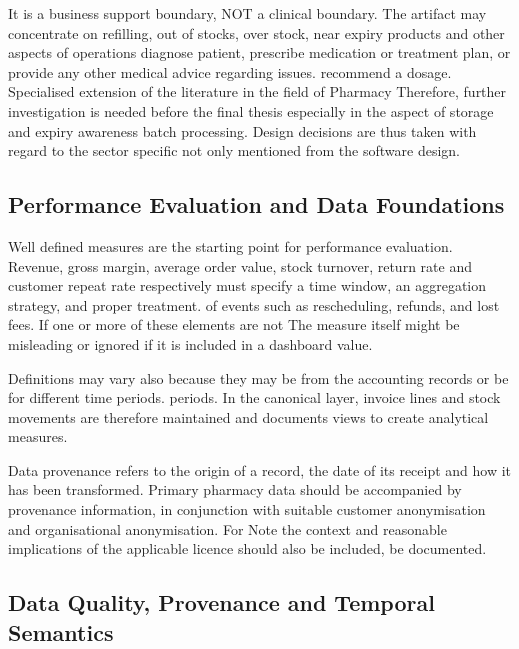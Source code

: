 \documentclass[a4paper,11pt,oneside]{book}
\theoremstyle{plain}
\theoremstyle{definition}
\theoremstyle{remark}
\begin{document}
It is a business support boundary, NOT a clinical boundary. The artifact may concentrate on refilling, out of stocks, over stock, near expiry products and other aspects of operations diagnose patient, prescribe medication or treatment plan, or provide any other medical advice regarding issues. recommend a dosage. Specialised extension of the literature in the field of Pharmacy Therefore, further investigation is needed before the final thesis especially in the aspect of storage and expiry awareness batch processing. Design decisions are thus taken with regard to the sector specific not only mentioned from the software design.

\subsection{Performance Evaluation and Data Foundations}

Well defined measures are the starting point for performance evaluation. Revenue, gross margin, average order value, stock turnover, return rate and customer repeat rate respectively must specify a time window, an aggregation strategy, and proper treatment. of events such as rescheduling, refunds, and lost fees. If one or more of these elements are not The measure itself might be misleading or ignored if it is included in a dashboard value.

Definitions may vary also because they may be from the accounting records or be for different time periods. periods. In the canonical layer, invoice lines and stock movements are therefore maintained and documents views to create analytical measures.

Data provenance refers to the origin of a record, the date of its receipt and how it has been transformed. Primary pharmacy data should be accompanied by provenance information, in conjunction with suitable customer anonymisation and organisational anonymisation. For Note the context and reasonable implications of the applicable licence should also be included, be documented.

\subsection{Data Quality, Provenance and Temporal Semantics}
\end{document}
